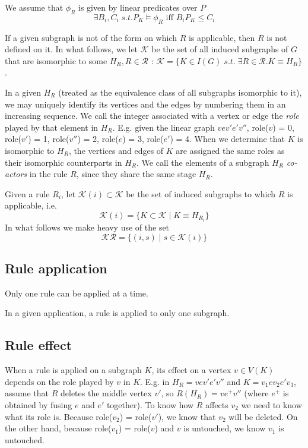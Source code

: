 \documentclass[11pt, oneside, reqno]{article}
\newcommand{\Kc}{\mathcal{K}}
\newcommand{\Rc}{\mathcal{R}}
\begin{document}
We assume that $\phi_R$ is given by linear predicates over $P$
\begin{equation}
\label{eq:formOfPhi}
\exists B_i, C_i\; s.t. P_K \models \phi_R \textrm{ iff } B_i P_K \leq C_i
\end{equation}

If a given subgraph is not of the form on which $R$ is applicable, then $R$ is not defined on it.
In what follows, we let $\Kc$ be the set of all induced subgraphs of $G$ that are isomorphic to some $H_{R}, R \in \Rc$ : 
$\Kc = \{K \in I(G) \; s.t. \; \exists R \in \Rc . K \equiv H_R\}$.

In a given $H_R$ (treated as the equivalence class of all subgraphs isomorphic to it), we may uniquely identify its vertices and the edges by numbering them in an increasing sequence.
We call the integer associated with a vertex or edge the \emph{role} played by that element in $H_R$.
E.g. given the linear graph $v e v' e' v''$, 
role($v$) = 0, role($v'$) = 1, role($v''$) = 2, role($e$) = 3, role($e'$) = 4.
When we determine that $K$ is isomorphic to $H_R$, the vertices and edges of $K$ are assigned the same roles as their isomorphic counterparts in $H_R$.
We call the elements of a subgraph $H_R$ \emph{co-actors} in the rule $R$, since they share the same stage $H_R$.

Given a rule $R_i$, let $\Kc(i) \subset \Kc$ be the set of induced subgraphs to which $R$ is applicable, i.e. 
\[\Kc(i) = \{K \subset \Kc \;|\; K \equiv H_{R_i}\}\]
In what follows we make heavy use of the set 
\[\Kc\Rc = \{(i,s) \;|\; s \in \Kc(i)\}\]

\subsection{Rule application}
Only one rule can be applied at a time. 

In a given application, a rule is applied to only one subgraph.

\subsection{Rule effect}
\label{ruleEffect}
When a rule is applied on a subgraph $K$, its effect on a vertex $v \in V(K)$ depends on the role played by $v$ in $K$. 
E.g. in $H_R = v e v' e' v''$ and $K = v_1 e v_2 e' v_3$, assume that $R$ deletes the middle vertex $v'$, so $R(H_R) =  v e^+ v''$ (where $e^+$ is obtained by fusing $e$ and $e'$ together).
To know how $R$ affects $v_2$ we need to know what its role is.
Because role($v_2$) = role($v'$), we know that $v_2$ will be deleted. 
On the other hand, because role($v_1$) = role($v$) and $v$ is untouched, we know $v_1$ is untouched.
\end{document}
